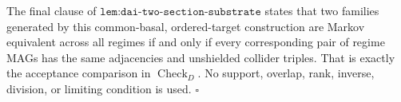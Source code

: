 The final clause of \(\texttt{lem:dai-two-section-substrate}\) states that two families generated by this common-basal, ordered-target construction are Markov equivalent across all regimes if and only if every corresponding pair of regime MAGs has the same adjacencies and unshielded collider triples.  That is exactly the acceptance comparison in \(\operatorname{Check}_{D}\).  No support, overlap, rank, inverse, division, or limiting condition is used. \(\square\)
